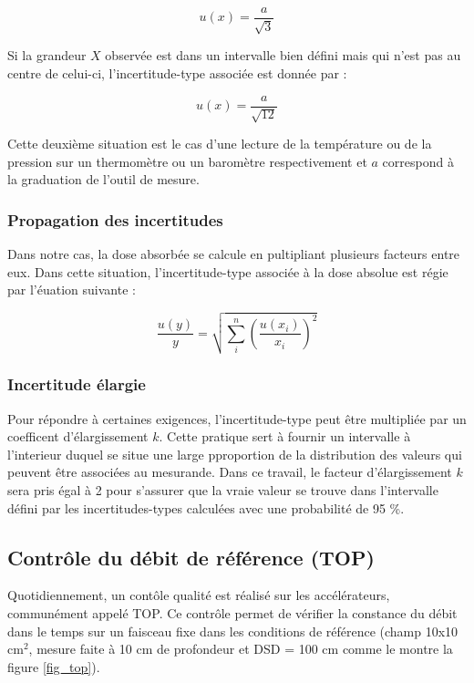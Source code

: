 \documentclass{article}
\begin{document}
\begin{equation}
  u(x) = \dfrac{a}{\sqrt{3}}
\end{equation}

Si la grandeur $X$ observée est dans un intervalle bien défini mais qui n'est pas au centre de celui-ci, l'incertitude-type associée est donnée par :

\begin{equation}
  u(x) = \dfrac{a}{\sqrt{12}}
\end{equation}

Cette deuxième situation est le cas d'une lecture de la température ou de la pression sur un thermomètre ou un baromètre respectivement et $a$ correspond à la graduation de l'outil de mesure.

\subsubsection{Propagation des incertitudes}

Dans notre cas, la dose absorbée se calcule en pultipliant plusieurs facteurs entre eux. Dans cette situation, l'incertitude-type associée à la dose absolue est régie par l'éuation suivante :

\begin{equation}
  \dfrac{u(y)}{y} = \sqrt{\sum\limits_i^n \left( \dfrac{u(x_i)}{x_i} \right) ^2}
\end{equation}

\subsubsection{Incertitude élargie}

Pour répondre à certaines exigences, l'incertitude-type peut être multipliée par un coefficent d'élargissement $k$. Cette pratique sert à fournir un intervalle à l'interieur duquel se situe une large pproportion de la distribution des valeurs qui peuvent être associées au mesurande. Dans ce travail, le facteur d'élargissement $k$ sera pris égal à 2 pour s'assurer que la vraie valeur se trouve dans l'intervalle défini par les incertitudes-types calculées avec une probabilité de 95 \%.


\subsection{Contrôle du débit de référence (TOP)}

Quotidiennement, un contôle qualité est réalisé sur les accélérateurs, communément appelé TOP. Ce contrôle permet de vérifier la constance du débit dans le temps sur un faisceau fixe dans les conditions de référence (champ 10x10 cm$^2$, mesure faite à 10 cm de profondeur et DSD = 100 cm comme le montre la figure \ref*{fig_top}). 
\end{document}
